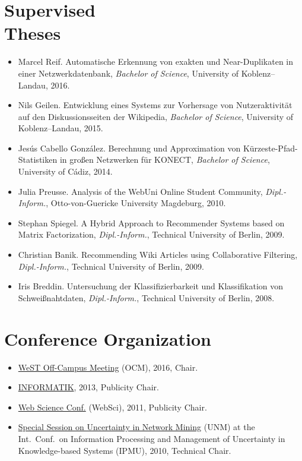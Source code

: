 \documentclass[line,margin]{res}
\begin{document}
\begin{resume}
\section{Supervised \\ Theses}
\begin{itemize}
\item Marcel Reif.  Automatische Erkennung von exakten und
  Near-Duplikaten in einer Netzwerkdatenbank, \emph{Bachelor of
    Science}, University of Koblenz--Landau, 2016.
\item Nils Geilen.  Entwicklung eines Systems zur Vorhersage von
  Nutzeraktivität auf den Diskussionsseiten der Wikipedia,
  \emph{Bachelor of Science}, University of Koblenz--Landau, 2015.
\item Jesús Cabello González.  Berechnung und Approximation von
  Kürzeste-Pfad-Statistiken in großen Netzwerken für KONECT,
  \emph{Bachelor of Science}, University of Cádiz, 2014. 
\item Julia Preusse. Analysis of the WebUni Online Student Community,
  \emph{Dipl.-Inform.}, Otto-von-Guericke University Magdeburg, 2010.  
\item Stephan Spiegel.  A Hybrid Approach to Recommender Systems based
  on Matrix Factorization, \emph{Dipl.-Inform.}, Technical University of
  Berlin, 2009.  
\item Christian Banik.  Recommending Wiki Articles using Collaborative
  Filtering, \emph{Dipl.-Inform.}, Technical University of Berlin, 2009. 
\item Iris Breddin.  Untersuchung der Klassifizierbarkeit und
  Klassifikation von Schweißnahtdaten, \emph{Dipl.-Inform.}, Technical
  University of Berlin, 2008.    
\end{itemize}

\section{Conference Organization}
\begin{itemize}
\item \href{https://sites.google.com/site/ocm2016/}{WeST Off-Campus
  Meeting} (OCM), 2016, Chair. 
\item \href{http://informatik2013.de/}{INFORMATIK}, 2013, Publicity Chair. 
\item \href{http://www.websci11.org/}{Web Science Conf.} (WebSci), 2011,
  Publicity Chair.  
\item \href{http://www.dai-labor.de/unm2010/}{Special Session on
  Uncertainty in Network Mining} (UNM) at the Int.\ Conf.\ on Information
  Processing and Management of Uncertainty in Knowledge-based Systems (IPMU),
  2010, Technical Chair.   
\end{itemize}


\end{resume}
\end{document}
